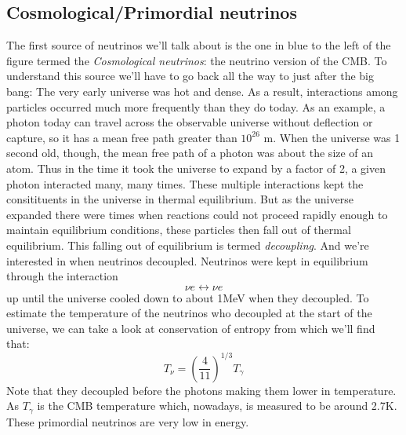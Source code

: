\documentclass[11pt,a4paper,faculty=we,language=en,doctype=report]{cls/ugent-doc}
\begin{document}
\subsection{Cosmological/Primordial neutrinos}
The first source of neutrinos we'll talk about is the one in blue to the left of the figure
termed the \textit{Cosmological neutrinos}: 
the neutrino version of the CMB.
To understand this source we'll have to go back all the way to just after the big bang:
The very early universe was hot and dense. As a result, interactions among particles
occurred much more frequently than they do today. As an example, a photon today
can travel across the observable universe without deflection or capture, so it has a
mean free path greater than $10^26$ m. When the universe was 1 second old, though, 
the mean free path of a photon was about the size of an atom. Thus in
the time it took the universe to expand by a factor of 2, a given photon interacted
many, many times. These multiple interactions kept the consitituents in the universe
in thermal equilibrium. But as the universe expanded there were times when reactions could
not proceed rapidly enough to maintain equilibrium conditions, these particles then fall out
of thermal equilibrium. This falling out of equilibrium is termed \textit{decoupling}.
And we're interested in when neutrinos decoupled.
Neutrinos were kept in equilibrium through the interaction 
\begin{equation}
	\nu e \leftrightarrow \nu e
\end{equation}
up until the universe cooled down to about 1MeV when they decoupled.
To estimate the temperature of the neutrinos who decoupled at the start of the universe, 
we can take a look at conservation of entropy \cite{Dodelson} from which we'll find that:
\begin{equation}
	T_\nu = \left(\frac{4}{11}\right)^{1/3}T_\gamma
\end{equation}
Note that they decoupled before the photons making them lower in temperature.
As $T_\gamma$ is the CMB temperature which, nowadays, is measured to be around 2.7K.
These primordial neutrinos are very low in energy.
\end{document}
